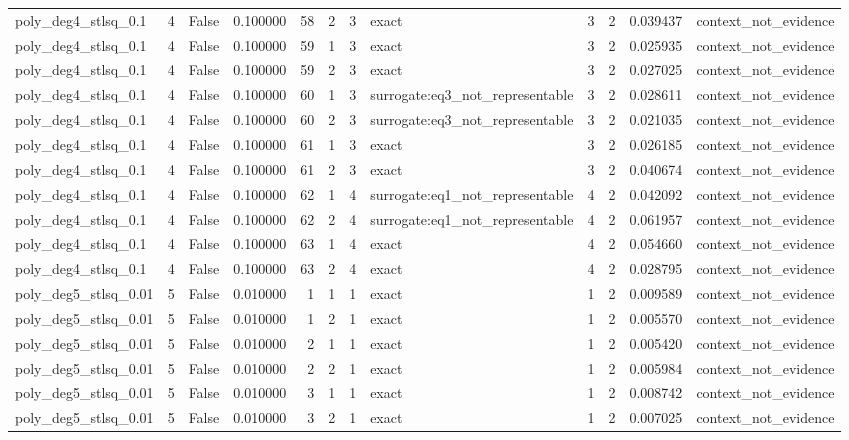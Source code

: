 \begin{tabular}{lrrrrrrlrrrl}
poly\_deg4\_stlsq\_0.1 & 4 & False & 0.100000 & 58 & 2 & 3 & exact & 3 & 2 & 0.039437 & context\_not\_evidence \\
poly\_deg4\_stlsq\_0.1 & 4 & False & 0.100000 & 59 & 1 & 3 & exact & 3 & 2 & 0.025935 & context\_not\_evidence \\
poly\_deg4\_stlsq\_0.1 & 4 & False & 0.100000 & 59 & 2 & 3 & exact & 3 & 2 & 0.027025 & context\_not\_evidence \\
poly\_deg4\_stlsq\_0.1 & 4 & False & 0.100000 & 60 & 1 & 3 & surrogate:eq3\_not\_representable & 3 & 2 & 0.028611 & context\_not\_evidence \\
poly\_deg4\_stlsq\_0.1 & 4 & False & 0.100000 & 60 & 2 & 3 & surrogate:eq3\_not\_representable & 3 & 2 & 0.021035 & context\_not\_evidence \\
poly\_deg4\_stlsq\_0.1 & 4 & False & 0.100000 & 61 & 1 & 3 & exact & 3 & 2 & 0.026185 & context\_not\_evidence \\
poly\_deg4\_stlsq\_0.1 & 4 & False & 0.100000 & 61 & 2 & 3 & exact & 3 & 2 & 0.040674 & context\_not\_evidence \\
poly\_deg4\_stlsq\_0.1 & 4 & False & 0.100000 & 62 & 1 & 4 & surrogate:eq1\_not\_representable & 4 & 2 & 0.042092 & context\_not\_evidence \\
poly\_deg4\_stlsq\_0.1 & 4 & False & 0.100000 & 62 & 2 & 4 & surrogate:eq1\_not\_representable & 4 & 2 & 0.061957 & context\_not\_evidence \\
poly\_deg4\_stlsq\_0.1 & 4 & False & 0.100000 & 63 & 1 & 4 & exact & 4 & 2 & 0.054660 & context\_not\_evidence \\
poly\_deg4\_stlsq\_0.1 & 4 & False & 0.100000 & 63 & 2 & 4 & exact & 4 & 2 & 0.028795 & context\_not\_evidence \\
poly\_deg5\_stlsq\_0.01 & 5 & False & 0.010000 & 1 & 1 & 1 & exact & 1 & 2 & 0.009589 & context\_not\_evidence \\
poly\_deg5\_stlsq\_0.01 & 5 & False & 0.010000 & 1 & 2 & 1 & exact & 1 & 2 & 0.005570 & context\_not\_evidence \\
poly\_deg5\_stlsq\_0.01 & 5 & False & 0.010000 & 2 & 1 & 1 & exact & 1 & 2 & 0.005420 & context\_not\_evidence \\
poly\_deg5\_stlsq\_0.01 & 5 & False & 0.010000 & 2 & 2 & 1 & exact & 1 & 2 & 0.005984 & context\_not\_evidence \\
poly\_deg5\_stlsq\_0.01 & 5 & False & 0.010000 & 3 & 1 & 1 & exact & 1 & 2 & 0.008742 & context\_not\_evidence \\
poly\_deg5\_stlsq\_0.01 & 5 & False & 0.010000 & 3 & 2 & 1 & exact & 1 & 2 & 0.007025 & context\_not\_evidence \\

\end{tabular}
